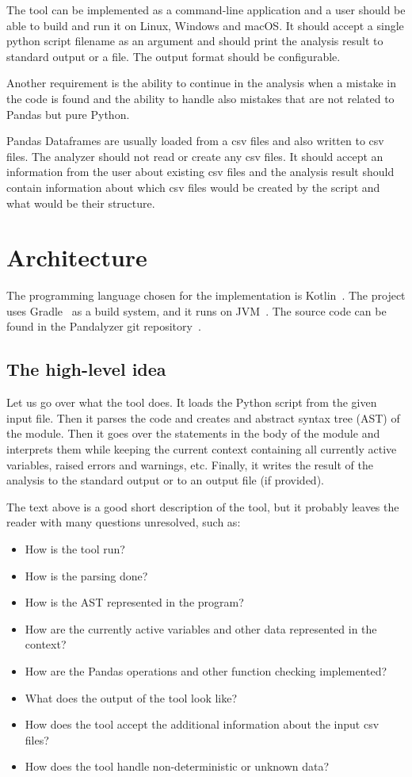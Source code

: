 The tool can be implemented as a command-line application and a user should be able to build and run it on Linux,
Windows and macOS\@.
It should accept a single python script filename as an argument and should print the analysis result to standard output
or a file.
The output format should be configurable.

Another requirement is the ability to continue in the analysis when a mistake in the code is found and the ability
to handle also mistakes that are not related to Pandas but pure Python. %

Pandas Dataframes are usually loaded from a csv files and also written to csv files.
The analyzer should not read or create any csv files.
It should accept an information from the user about existing csv files and the analysis result should contain
information about which csv files would be created by the script and what would be their structure.

\section{Architecture}

The programming language chosen for the implementation is Kotlin~\cite{kotlinDocs}.
The project uses Gradle~\cite{gradleDocs} as a build system, and it runs on JVM~\cite{jvmSpec}\@.
The source code can be found in the Pandalyzer git repository~\cite{pandalyzer}.

\subsection{The high-level idea}

Let us go over what the tool does.
It loads the Python script from the given input file.
Then it parses the code and creates and abstract syntax tree (AST) of the module.
Then it goes over the statements in the body of the module and interprets them while keeping the current context
containing all currently active variables, raised errors and warnings, etc.
Finally, it writes the result of the analysis to the standard output or to an output file (if provided).

The text above is a good short description of the tool, but it probably leaves the reader with many questions unresolved,
such as:
\begin{itemize}
    \item How is the tool run?
    \item How is the parsing done?
    \item How is the AST represented in the program?
    \item How are the currently active variables and other data represented in the context?
    \item How are the Pandas operations and other function checking implemented?
    \item What does the output of the tool look like?
    \item How does the tool accept the additional information about the input csv files?
    \item How does the tool handle non-deterministic or unknown data?
\end{itemize}

